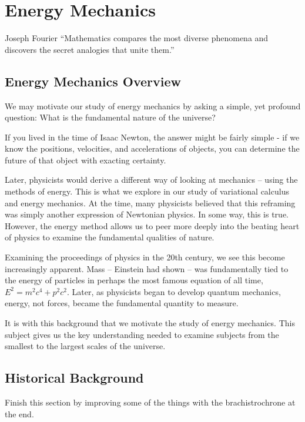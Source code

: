 
\part{Energy Mechanics}\label{part: energy mech}
\begin{chapquote}{Joseph Fourier}
    ``Mathematics compares the most diverse phenomena and discovers the secret analogies that unite them.''
\end{chapquote}

\chapter*{Energy Mechanics Overview}

We may motivate our study of energy mechanics by asking a simple, yet profound question:
What is the fundamental nature of the universe?

If you lived in the time of Isaac Newton, the answer might be fairly simple - if we know the positions, velocities, and accelerations of objects, you can determine the future of that object with exacting certainty. 

Later, physicists would derive a different way of looking at mechanics -- using the methods of energy. This is what we explore in our study of variational calculus and energy mechanics. At the time, many physicists believed that this reframing was simply another expression of Newtonian physics. In some way, this is true. However, the energy method allows us to peer more deeply into the beating heart of physics to examine the fundamental qualities of nature. 

Examining the proceedings of physics in the 20th century, we see this become increasingly apparent. Mass -- Einstein had shown -- was fundamentally tied to the energy of particles in perhaps the most famous equation of all time, $E^2=m^2c^4+p^2c^2$. Later, as physicists began to develop quantum mechanics, energy, not forces, became the fundamental quantity to measure.

It is with this background that we motivate the study of energy mechanics. This subject gives us the key understanding needed to examine subjects from the smallest to the largest scales of the universe.

\chapter{Historical Background }

\color{red} Finish this section by improving some of the things with the brachistrochrone at the end.
\color{black}

